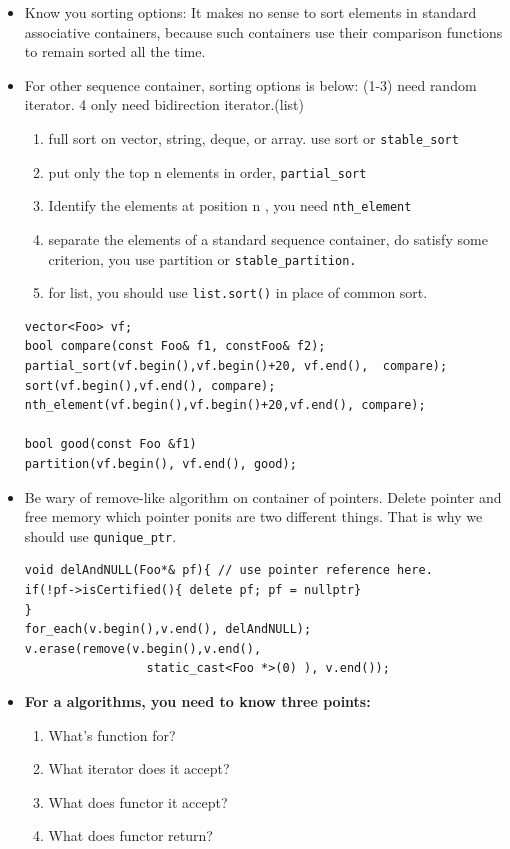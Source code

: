 \documentclass[a4paper,11pt,twoside]{book}
\begin{document}
\begin{itemize}
\item Know you sorting options: It makes no sense to sort elements in standard associative containers, because such containers use their comparison functions to remain sorted all the time.

\item For other sequence container, sorting options is below: (1-3) need random iterator. 4 only need bidirection iterator.(list)
  \begin{enumerate}
  \item full sort on vector, string, deque, or array.  use sort or \texttt{stable\_sort}
  \item put only the top n elements in order, \texttt{partial\_sort}
  \item Identify the elements at position n , you need \texttt{nth\_element}
  \item separate the elements of a standard sequence container, do satisfy some criterion, you use partition or \texttt{stable\_partition.}
  \item for list, you should use \texttt{list.sort()} in place of common sort.
  \end{enumerate}
\begin{lstlisting}[numbers=none]
vector<Foo> vf;
bool compare(const Foo& f1, constFoo& f2);
partial_sort(vf.begin(),vf.begin()+20, vf.end(),  compare);
sort(vf.begin(),vf.end(), compare);
nth_element(vf.begin(),vf.begin()+20,vf.end(), compare);

bool good(const Foo &f1)
partition(vf.begin(), vf.end(), good);
\end{lstlisting}

\item Be wary of remove-like algorithm on container of pointers. Delete pointer and free memory which pointer ponits are two different things. That is why we should use \texttt{qunique\_ptr}.
\begin{lstlisting}[numbers=none]
void delAndNULL(Foo*& pf){ // use pointer reference here.
if(!pf->isCertified(){ delete pf; pf = nullptr}
}
for_each(v.begin(),v.end(), delAndNULL);
v.erase(remove(v.begin(),v.end(),
                 static_cast<Foo *>(0) ), v.end());
\end{lstlisting}

\item \textbf{For a algorithms, you need to know three points:}
\begin{enumerate}
	\item What's function  for?
	\item What iterator does it accept? 
	\item What does functor it accept?
	\item What does functor return?
\end{enumerate}
	
\end{itemize}
\end{document}
